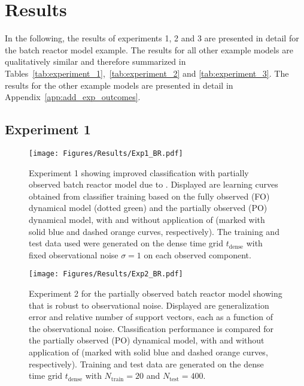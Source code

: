 \section{Results}\label{sec:results}
In the following, the results of experiments 1, 2 and 3 are presented in detail for the batch reactor model example.
The results for all other example models are qualitatively similar and therefore summarized in Tables~\ref{tab:experiment_1},~\ref{tab:experiment_2} and \ref{tab:experiment_3}.
The results for the other example models are presented in detail in Appendix~\ref{app:add_exp_outcomes}.

\subsection{Experiment 1}

\begin{figure}[t!]
    \centering
    \texttt{[image: Figures/Results/Exp1\_BR.pdf]}
    \caption{Experiment 1 showing improved classification with partially observed batch reactor model due to \myMethod{}. 
    Displayed are learning curves obtained from classifier training based on the fully observed (FO) dynamical model (dotted green) and the partially observed (PO) dynamical model, with and without application of \myMethod{} (marked with solid blue and dashed orange curves, respectively).
    The training and test data used were generated on the dense time grid $t_{\text{dense}}$ with fixed observational noise $\sigma = 1$ on each observed component.
    }
    \label{fig:exp1_BR}
\end{figure}

\begin{figure}[t!]
    \centering
    \texttt{[image: Figures/Results/Exp2\_BR.pdf]}
    \caption{Experiment 2 for the partially observed batch reactor model showing that \myMethod{} is robust to observational noise.
    Displayed are generalization error and relative number of support vectors, each as a function of the observational noise.
    Classification performance is compared for the partially observed (PO) dynamical model, with and without application of \myMethod{} (marked with solid blue and dashed orange curves, respectively).
    Training and test data are generated on the dense time grid $t_{\text{dense}}$ with $N_{\text{train}} = 20$ and $N_{\text{test}} = 400$.
    }
    \label{fig:exp2_BR}
\end{figure}

